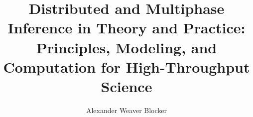 
\title{Distributed and Multiphase Inference in Theory and Practice: Principles, Modeling, and Computation for High-Throughput Science}
\author{Alexander Weaver Blocker}


